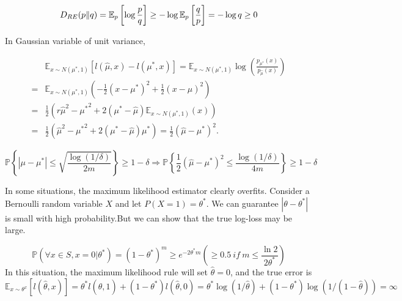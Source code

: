 \[
    D_{RE}(p \Arrowvert q) = \mathbb{E}_{p} \left[ \log \frac{p}{q}  \right] \ge -\log \mathbb{E}_{p}\left[ \frac{q}{p}  \right] = -\log q \ge 0
\]

In Gaussian variable of unit variance,

\begin{align*}
    &\mathbb{E}_{x \sim N(\mu ^*, 1)} \left[ l(\hat \mu, x) - l(\mu^*, x) \right]
    = \mathbb{E}_{x \sim N(\mu ^*, 1)} \log \left( \frac{p_{\mu^*}(x)}{p_{\hat\mu}(x)}  \right)\\
    =& \mathbb{E}_{x \sim N(\mu ^*, 1)} \left( -\frac{1}{2} {(x - \mu^*)}^2 + \frac{1}{2} {(x - \hat\mu)}^2 \right)\\
    =& \frac{1}{2} \left( r{\hat \mu}^2 - {\mu^*}^2 + 2(\mu^* - \hat\mu) \mathbb{E}_{x \sim N(\mu^*, 1)}(x) \right)\\
    =& \frac{1}{2} \left(  {\hat \mu}^2 - {\mu^*}^2 + 2(\mu^* - \hat\mu) \mu^* \right) = \frac{1}{2} {(\hat\mu - \mu^*)}^2.
\end{align*}

\[
   \mathbb{P} \left\{ \left| \mu - \mu^* \right| \le \sqrt{\frac{\log(1/\delta)}{2m} }\right\} \ge 1 - \delta   
   \Rightarrow \mathbb{P}\left\{ \frac{1}{2} {(\hat\mu - \mu^*)}^2 \le \frac{\log(1/\delta)}{4m} \right\} \ge 1 - \delta
\]

In some situations, the maximum likelihood estimator clearly overfits. Consider a Bernoulli random variable $ X $ and let $ P(X=1) = \theta^* $. We can guarantee $ \left| \theta - \theta^* \right| $ is small with high probability.But we can show that the true {log-loss} may be large.

\[
    \mathbb{P} \left( \forall x \in S, x = 0 | \theta^* \right) = {(1 - \theta^*)}^m \ge e^{-2 \theta^* m}
    ( \ge 0.5\ if\ m \le \frac{\ln 2}{2 \theta^*} )
\]
In this situation, the maximum likelihood rule will set $ \hat\theta = 0 $, and the true error is
\[
    \mathbb{E}_{x \sim \theta^x} \left[ l(\hat \theta, x) \right] = \theta^* l(\hat\theta, 1) + (1 - \theta^*) l(\hat\theta, 0) = \theta^* \log(1/{\hat \theta}) + (1 - \theta^*) \log(1 / (1 - \hat\theta)) = \infty
\]

